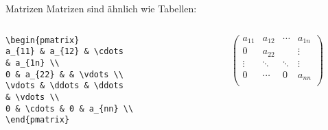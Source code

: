 \begin{frame}[fragile]{Matrizen}
Matrizen sind ähnlich wie Tabellen:\pause
\begin{columns}
\begin{column}{0.55\textwidth}
\begin{codeblock}
\begin{verbatim}
\begin{pmatrix}
a_{11} & a_{12} & \cdots 
& a_{1n} \\
0 & a_{22} & & \vdots \\
\vdots & \ddots & \ddots 
& \vdots \\
0 & \cdots & 0 & a_{nn} \\
\end{pmatrix}
\end{verbatim}
\end{codeblock}
\end{column}\pause
\begin{column}{0.35\textwidth}
\[
\begin{pmatrix}
a_{11} & a_{12} & \cdots & a_{1n} \\
0 & a_{22} & & \vdots \\
\vdots & \ddots & \ddots & \vdots \\
0 & \cdots & 0 & a_{nn} \\
\end{pmatrix}
\]
\end{column}
\end{columns}
\end{frame}